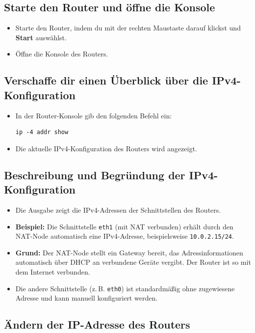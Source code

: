 \documentclass[12pt, a4paper]{article}\usepackage{listings}
\begin{document}
\subsection{Starte den Router und öffne die Konsole}
\begin{itemize}
    \item Starte den Router, indem du mit der rechten Maustaste darauf klickst und \textbf{Start} auswählst.
    \item Öffne die Konsole des Routers.
\end{itemize}

\subsection{Verschaffe dir einen Überblick über die IPv4-Konfiguration}
\begin{itemize}
    \item In der Router-Konsole gib den folgenden Befehl ein:
    \begin{verbatim}
ip -4 addr show
    \end{verbatim}
    \item Die aktuelle IPv4-Konfiguration des Routers wird angezeigt.
\end{itemize}

\subsection{Beschreibung und Begründung der IPv4-Konfiguration}
\begin{itemize}
    \item Die Ausgabe zeigt die IPv4-Adressen der Schnittstellen des Routers.
    \item \textbf{Beispiel:} Die Schnittstelle \texttt{eth1} (mit NAT verbunden) erhält durch den NAT-Node automatisch eine IPv4-Adresse, beispielsweise \texttt{10.0.2.15/24}.
    \item \textbf{Grund:} Der NAT-Node stellt ein Gateway bereit, das Adressinformationen automatisch über DHCP an verbundene Geräte vergibt. Der Router ist so mit dem Internet verbunden.
    \item Die andere Schnittstelle (z.\,B. \texttt{eth0}) ist standardmäßig ohne zugewiesene Adresse und kann manuell konfiguriert werden.
\end{itemize}

\newpage
\newpage
\subsection{Ändern der IP-Adresse des Routers}
\end{document}
